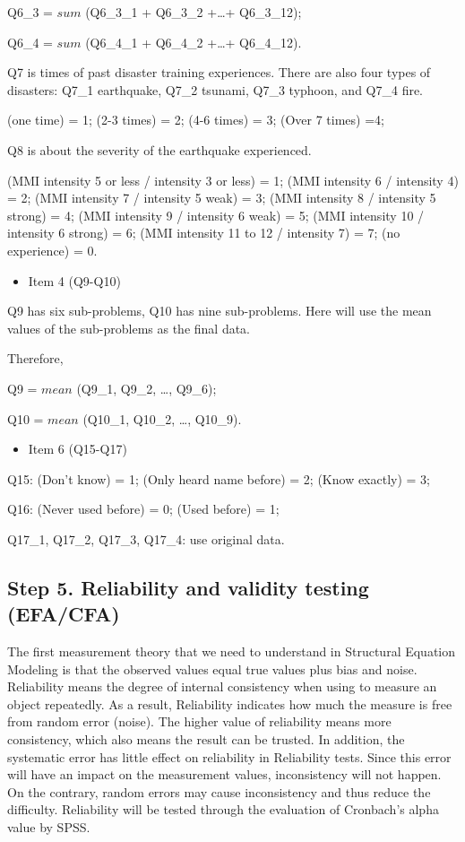 Q6\_3 = $sum$ (Q6\_3\_1 + Q6\_3\_2 +\dots+ Q6\_3\_12);

Q6\_4 = $sum$ (Q6\_4\_1 + Q6\_4\_2 +\dots+ Q6\_4\_12).

Q7 is times of past disaster training experiences. There are also four types of disasters: Q7\_1 earthquake, Q7\_2 tsunami, Q7\_3 typhoon, and Q7\_4 fire.
 
(one time) = 1; (2-3 times) = 2; (4-6 times) = 3; (Over 7 times) =4;

Q8 is about the severity of the earthquake experienced.

(MMI intensity 5 or less / intensity 3 or less) = 1; (MMI intensity 6 / intensity 4) = 2; (MMI intensity 7 / intensity 5 weak) = 3; (MMI intensity 8 / intensity 5 strong) = 4; (MMI intensity 9 / intensity 6 weak) = 5; (MMI intensity 10 / intensity 6 strong) = 6; (MMI intensity 11 to 12 / intensity 7) = 7; (no experience) = 0.


\begin{itemize}
\item Item 4 (Q9-Q10)
\end{itemize}

Q9 has six sub-problems, Q10 has nine sub-problems. Here will use the mean values of the sub-problems as the final data. 

Therefore, 

Q9 = $mean$ (Q9\_1, Q9\_2, \dots, Q9\_6);

Q10 = $mean$ (Q10\_1, Q10\_2, \dots, Q10\_9).

\begin{itemize}
\item Item 6 (Q15-Q17)
\end{itemize}

Q15: (Don't know) = 1; (Only heard name before) = 2; (Know exactly) = 3;

Q16: (Never used before) = 0; (Used before) = 1;
 
Q17\_1, Q17\_2, Q17\_3, Q17\_4: use original data.

\subsection{Step 5. Reliability and validity testing (EFA/CFA)}
\label{step5}
The first measurement theory that we need to understand in Structural Equation Modeling is that the observed values equal true values plus bias and noise. Reliability means the degree of internal consistency when using to measure an object repeatedly. As a result, Reliability indicates how much the measure is free from random error (noise). The higher value of reliability means more consistency, which also means the result can be trusted. In addition, the systematic error has little effect on reliability in Reliability tests. Since this error will have an impact on the measurement values, inconsistency will not happen. On the contrary, random errors may cause inconsistency and thus reduce the difficulty. Reliability will be tested through the evaluation of Cronbach's alpha value by SPSS. 

